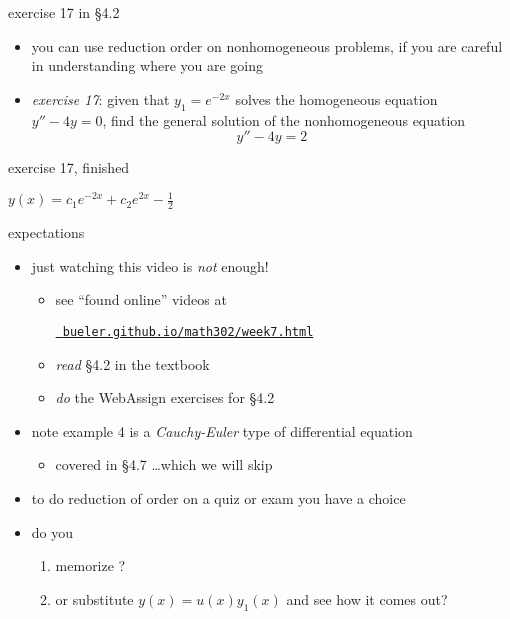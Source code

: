 \documentclass[dvipsnames]{beamer}
\begin{document}
\begin{frame}{exercise 17 in \S4.2}

\begin{itemize}
\item you can use reduction order on nonhomogeneous problems, if you are careful in understanding where you are going
\item \emph{exercise 17}:  given that $y_1=e^{-2x}$ solves the homogeneous equation $y''-4y=0$, find the general solution of the nonhomogeneous equation
    $$y'' - 4y = 2$$
\end{itemize}

\vspace{50mm}
\end{frame}


\begin{frame}{exercise 17, finished}

\vspace{60mm}

\hfill $y(x) = c_1 e^{-2x} + c_2 e^{2x} - \frac{1}{2}$
\end{frame}


\begin{frame}{expectations}

\begin{itemize}
\item just watching this video is \emph{not} enough!
     \begin{itemize}
     \item see ``found online'' videos at

     \centerline{\href{https://bueler.github.io/math302/week7.html}{\tt \color{cyan} bueler.github.io/math302/week7.html}}
     \item \emph{read} \S 4.2 in the textbook
     \item \emph{do} the WebAssign exercises for \S 4.2
     \end{itemize}
\item note example 4 is a \emph{Cauchy-Euler} type of differential equation
     \begin{itemize}
     \item covered in \S 4.7 \dots which we will skip
     \end{itemize}
\item to do reduction of order on a quiz or exam you have a \alert{choice}
\item do you
     \begin{enumerate}
     \item memorize ?

\medskip
     \item or substitute $y(x) = u(x) y_1(x)$ and see how it comes out?
     \end{enumerate}
\end{itemize}
\end{frame}
\end{document}
